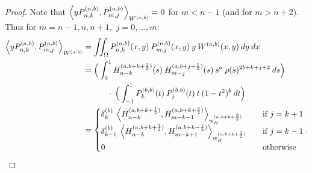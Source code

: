 \documentclass[11pt, oneside]{article}   	%
\newcommand{\half}{\frac{1}{2}}
\newcommand{\Pnkab}{P_{n,k}^{(a,b)}}
\newcommand{\Wab}{{W^{(a,b)}}}
\newcommand{\Pmjab}{P_{m,j}^{(a,b)}}
\begin{document}
\begin{proof}
Note that \(\ip<y \Pnkab, P_{m,j}^{(a,b)}>_\Wab = 0\) for \(m < n-1\) (and for \(m > n+2\)). Thus for \(m = n-1, n, n+1,\) \(j = 0,\dots,m:\)
\begin{align}
\ip<y \Pnkab, P_{m,j}^{(a,b)}>_\Wab &=  \iint_\Omega \Pnkab(x,y) \: \Pmjab(x,y) \: y \: \Wab(x,y) \: dy \: dx \\
&= \Big( \int^1_0 H_{n-k}^{(a, b+k+\half)}(s) \: H_{m-j}^{(a, b+j+\half)}(s) \: s^a \: \rho(s)^{2b+k+j+2} \: ds \Big) \nonumber \\
& \quad \quad \quad\cdot \: \Big( \int^1_{-1} P_k^{(b,b)}(t) \: P_j^{(b,b)}(t) \: t \: (1-t^2)^b \: dt \Big) \\
&= \begin{cases}
    	\delta_k^{(b)} \: \ip<H_{n-k}^{(a, b+k+\half)}, H_{m-k-1}^{(a, b+k+\frac{3}{2})}>_{w_H^{(a, b+k+\frac{3}{2})}} \quad& \text{if } j = k+1 \\
	\delta_{k-1}^{(b)} \: \ip<H_{n-k}^{(a, b+k+\half)}, H_{m-k+1}^{(a, b+k-\half)}>_{w_H^{(a, b+k+\half)}} \quad& \text{if } j = k-1 \\
	0 & \text{otherwise}
      \end{cases}.
\end{align}

\end{proof}
\end{document}

